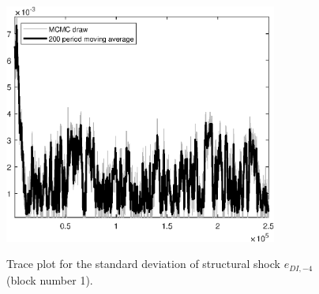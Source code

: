 \begin{figure}[H]
\centering
  \includegraphics[width=0.8\textwidth]{BRS_aggregate/graphs/TracePlot_SE_e_DI_news_blck_1}\\
    \caption{Trace plot for the standard deviation of structural shock ${e_{DI,-4}}$ (block number 1).}
\end{figure}
